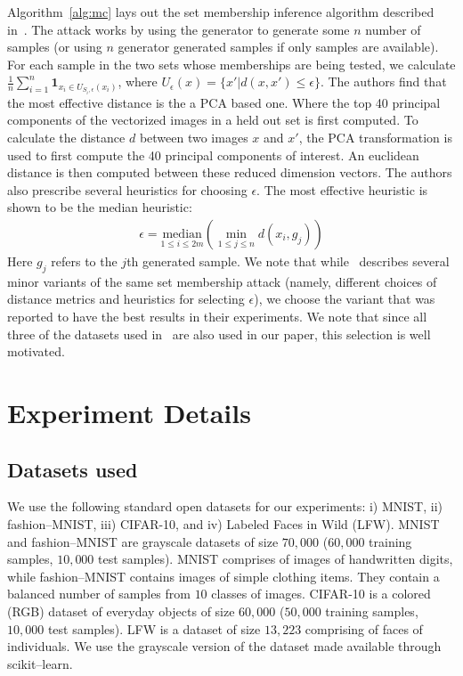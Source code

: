 \documentclass{article}
\begin{document}
Algorithm~\ref{alg:mc} lays out the set membership inference algorithm described in~\cite{hilprecht2019monte}. The attack works by using the generator to generate some $n$ number of samples (or using $n$ generator generated samples if only samples are available). For each sample in the two sets whose memberships are being tested, we calculate $\frac{1}{n}\sum_{i=1}^n\mathbf{1}_{x_i \in U_{S_i,\epsilon}(x_i)}$, where $U_{\epsilon}(x) = \{x'|d(x,x')\leq \epsilon\}$. The authors find that the most effective distance is the a PCA based one. Where the top 40 principal components of the vectorized images in a held out set is first computed. To calculate the distance $d$ between two images $x$ and $x'$, the PCA transformation is used to first compute the 40 principal components of interest. An euclidean distance is then computed between these reduced dimension vectors. The authors also prescribe several heuristics for choosing $\epsilon$. The most effective heuristic is shown to be the median heuristic: 
\begin{align*}
\epsilon = \underset{1\leq i \leq 2 m}{\mathrm{median}}(\min_{1 \leq j \leq n} d(x_i,g_j))
\end{align*}
Here $g_j$ refers to the $j$th generated sample. We note that while~\cite{hilprecht2019monte} describes several minor variants of the same set membership attack (namely, different choices of distance metrics and heuristics for selecting $\epsilon$), we choose the variant that was reported to have the best results in their experiments. We note that since all three of the datasets used in~\cite{hilprecht2019monte} are also used in our paper, this selection is well motivated. 

\section{Experiment Details}
\subsection{Datasets used}
We use the following standard open datasets for our experiments: i) MNIST, ii) fashion--MNIST, iii) CIFAR-10, and iv) Labeled Faces in Wild (LFW). MNIST and fashion--MNIST are grayscale datasets of size $70,000$ ($60,000$ training samples, $10,000$ test samples). MNIST comprises of images of handwritten digits, while fashion--MNIST contains images of simple clothing items. They contain a balanced number of samples from $10$ classes of images. CIFAR-10 is a colored (RGB) dataset of everyday objects of size $60,000$ ($50,000$ training samples, $10,000$ test samples). LFW is a dataset of size $13,223$ comprising of faces of individuals. We use the grayscale version of the dataset made available through scikit--learn.
\end{document}
